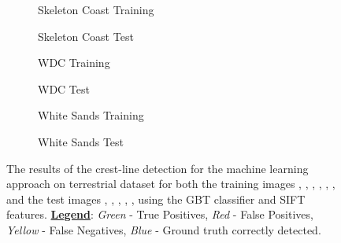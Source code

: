 \begin{figure}
	\ContinuedFloat
	\centering
	\begin{subfigure}{0.48\textwidth}
		\centering
		\caption{ Skeleton Coast Training }
		\label{fig:ml_skeleton_coast_results}
	\end{subfigure}
	\begin{subfigure}{0.48\textwidth}
		\centering
		\caption{ Skeleton Coast Test }
		\label{fig:ml_skeleton_coast_test_results}
	\end{subfigure}
	\begin{subfigure}{0.48\textwidth}
		\centering
		\caption{ WDC Training }
		\label{fig:ml_wdc_results}
	\end{subfigure}
	\begin{subfigure}{0.48\textwidth}
		\centering
		\caption{ WDC Test }
		\label{fig:ml_wdc_test_results}
	\end{subfigure}
	\begin{subfigure}{0.48\textwidth}
		\centering
		\caption{ White Sands Training }
		\label{fig:ml_white_sands_results}
	\end{subfigure}
	\begin{subfigure}{0.48\textwidth}
		\centering
		\caption{ White Sands Test }
		\label{fig:ml_white_sands_test_results}
	\end{subfigure}
	\caption{ The results of the  crest-line detection for the machine learning approach on terrestrial dataset for both the training images , , , , , , and the test images , , , , ,  using the GBT classifier and SIFT features. \underline{\textbf{Legend}}: \emph{Green} - True Positives, \emph{Red} - False Positives, \emph{Yellow} - False Negatives, \emph{Blue} - Ground truth correctly detected.  }
	\label{fig:ml_results}
\end{figure}

